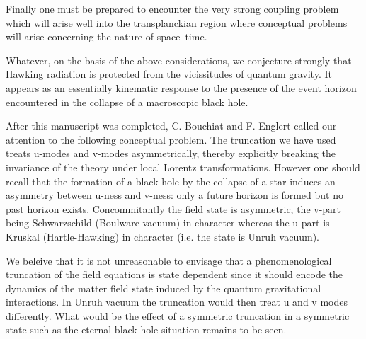 \documentclass[12pt]{article}
\begin{document}
Finally one must be prepared to encounter the very strong coupling problem
which will arise well into the transplanckian region where 
conceptual problems will arise  concerning the nature of space--time. 

Whatever, on the basis of the above considerations, we conjecture strongly that
Hawking radiation is protected from the vicissitudes of quantum gravity. It
appears as an essentially kinematic response to the presence of the event
horizon encountered in the collapse of a macroscopic black hole.

\vskip 1cm
After this manuscript was completed, C. Bouchiat and F.
Englert called our attention to the following conceptual problem.
The truncation we have used treats u-modes and v-modes
asymmetrically, thereby explicitly breaking the invariance of the theory
under local Lorentz transformations. However one should recall that the
formation of a black hole by the collapse of a star induces an
asymmetry between u-ness and v-ness:  only a future
horizon is formed but no past horizon exists. Concommitantly the field
state is asymmetric, the v-part being Schwarzschild (Boulware vacuum)
in character whereas
the u-part is Kruskal (Hartle-Hawking)
in character (i.e. the state is Unruh vacuum).

We beleive that it is  not unreasonable to envisage that a phenomenological truncation
of the field equations is state dependent since it should encode the
dynamics of the matter field state induced by the quantum gravitational
interactions. In Unruh vacuum the truncation would then treat u and v
modes differently. What would be the effect of a symmetric truncation
in a symmetric state such as the eternal black hole situation
remains to be seen. 
\end{document}
